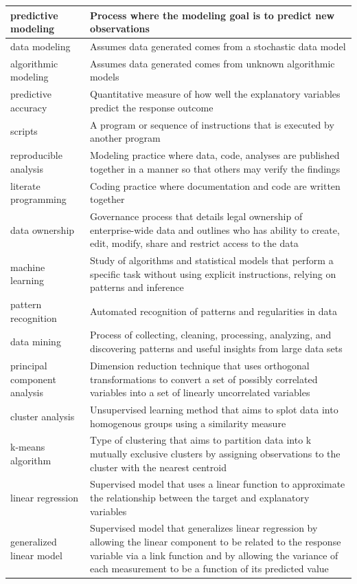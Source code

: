 \documentclass[
]{book}
\begin{document}
\begin{longtable}{>{\raggedright\arraybackslash}p{10em}|>{\raggedright\arraybackslash}p{30em}}
\hline
predictive modeling & Process where the modeling goal is to predict new observations\\
\hline
data modeling & Assumes data generated comes from a stochastic data model\\
\hline
algorithmic modeling & Assumes data generated comes from unknown algorithmic models\\
\hline
predictive accuracy & Quantitative measure of how well the explanatory variables predict the response outcome\\
\hline
scripts & A program or sequence of instructions that is executed by another program\\
\hline
reproducible analysis & Modeling practice where data, code, analyses are published together in a manner so that others may verify the findings\\
\hline
literate programming & Coding practice where documentation and code are written together\\
\hline
data ownership & Governance process that details legal ownership of enterprise-wide data and outlines who has ability to create, edit, modify, share and restrict access to the data\\
\hline
machine learning & Study of algorithms and statistical models that perform a specific task without using explicit instructions, relying on patterns and inference\\
\hline
pattern recognition & Automated recognition of patterns and regularities in data\\
\hline
data mining & Process of collecting, cleaning, processing, analyzing, and discovering patterns and useful insights from large data sets\\
\hline
principal component analysis & Dimension reduction technique that uses orthogonal transformations to convert a set of possibly correlated variables into a set of linearly uncorrelated variables\\
\hline
cluster analysis & Unsupervised learning method that aims to splot data into homogenous groups using a similarity measure\\
\hline
k-means algorithm & Type of clustering that aims to partition data into k mutually exclusive clusters by assigning observations to the cluster with the nearest centroid\\
\hline
linear regression & Supervised model that uses a linear function to approximate the relationship between the target and explanatory variables\\
\hline
generalized linear model & Supervised model that generalizes linear regression by allowing the linear component to be related to the response variable via a link function and by allowing the variance of each measurement to be a function of its predicted value\\

\end{longtable}
\end{document}
